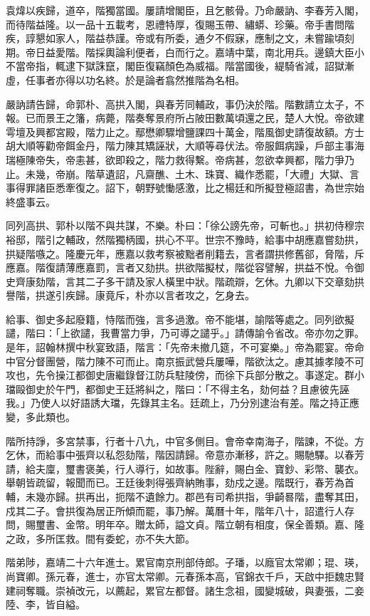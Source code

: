 \begin{pinyinscope}
袁煒以疾歸，道卒，階獨當國。屢請增閣臣，且乞骸骨。乃命嚴訥、李春芳入閣，而待階益隆。以一品十五載考，恩禮特厚，復賜玉帶、繡蟒、珍藥。帝手書問階疾，諄懇如家人，階益恭謹。帝或有所委，通夕不假寐，應制之文，未嘗踰頃刻期。帝日益愛階。階採輿論利便者，白而行之。嘉靖中葉，南北用兵。邊鎮大臣小不當帝指，輒逮下獄誅竄，閣臣復竊顏色為威福。階當國後，緹騎省減，詔獄漸虛，任事者亦得以功名終。於是論者翕然推階為名相。

嚴訥請告歸，命郭朴、高拱入閣，與春芳同輔政，事仍決於階。階數請立太子，不報。已而景王之籓，病薨，階奏奪景府所占陂田數萬頃還之民，楚人大悅。帝欲建雩壇及興都宮殿，階力止之。鄢懋卿驟增鹽課四十萬金，階風御史請復故額。方士胡大順等勸帝餌金丹，階力陳其矯誣狀，大順等尋伏法。帝服餌病躁，戶部主事海瑞極陳帝失，帝恚甚，欲即殺之，階力救得繫。帝病甚，忽欲幸興都，階力爭乃止。未幾，帝崩。階草遺詔，凡齋醮、土木、珠寶、織作悉罷，「大禮」大獄、言事得罪諸臣悉牽復之。詔下，朝野號慟感激，比之楊廷和所擬登極詔書，為世宗始終盛事云。

同列高拱、郭朴以階不與共謀，不樂。朴曰：「徐公謗先帝，可斬也。」拱初侍穆宗裕邸，階引之輔政，然階獨柄國，拱心不平。世宗不豫時，給事中胡應嘉嘗劾拱，拱疑階嗾之。隆慶元年，應嘉以救考察被黜者削籍去，言者謂拱修舊郤，脅階，斥應嘉。階復請薄應嘉罰，言者又劾拱。拱欲階擬杖，階從容譬解，拱益不悅。令御史齊康劾階，言其二子多干請及家人橫里中狀。階疏辯，乞休。九卿以下交章劾拱譽階，拱遂引疾歸。康竟斥，朴亦以言者攻之，乞身去。

給事、御史多起廢籍，恃階而強，言多過激。帝不能堪，諭階等處之。同列欲擬譴，階曰：「上欲譴，我曹當力爭，乃可導之譴乎。」請傳諭令省改。帝亦勿之罪。是年，詔翰林撰中秋宴致語，階言：「先帝未撤几筵，不可宴樂。」帝為罷宴。帝命中官分督團營，階力陳不可而止。南京振武營兵屢嘩，階欲汰之。慮其據孝陵不可攻也，先令操江都御史唐繼錄督江防兵駐陵傍，而徐下兵部分散之。事遂定。群小璫毆御史於午門，都御史王廷將糾之，階曰：「不得主名，劾何益？且慮彼先誣我。」乃使人以好語誘大璫，先錄其主名。廷疏上，乃分別逮治有差。階之持正應變，多此類也。

階所持諍，多宮禁事，行者十八九，中官多側目。會帝幸南海子，階諫，不從。方乞休，而給事中張齊以私怨劾階，階因請歸。帝意亦漸移，許之。賜馳驛。以春芳請，給夫廩，璽書褒美，行人導行，如故事。陛辭，賜白金、寶鈔、彩幣、襲衣。舉朝皆疏留，報聞而已。王廷後刺得張齊納賄事，劾戍之邊。階既行，春芳為首輔，未幾亦歸。拱再出，扼階不遺餘力。郡邑有司希拱指，爭齮晷階，盡奪其田，戍其二子。會拱復為居正所傾而罷，事乃解。萬曆十年，階年八十，詔遣行人存問，賜璽書、金幣。明年卒。贈太師，謚文貞。階立朝有相度，保全善類。嘉、隆之政，多所匡救。間有委蛇，亦不失大節。

階弟陟，嘉靖二十六年進士。累官南京刑部侍郎。子璠，以廕官太常卿；琨、瑛，尚寶卿。孫元春，進士，亦官太常卿。元春孫本高，官錦衣千戶，天啟中拒魏忠賢建祠奪職。崇禎改元，以薦起，累官左都督。諸生念祖，國變城破，與妻張，二妾陸、李，皆自縊。


\end{pinyinscope}
